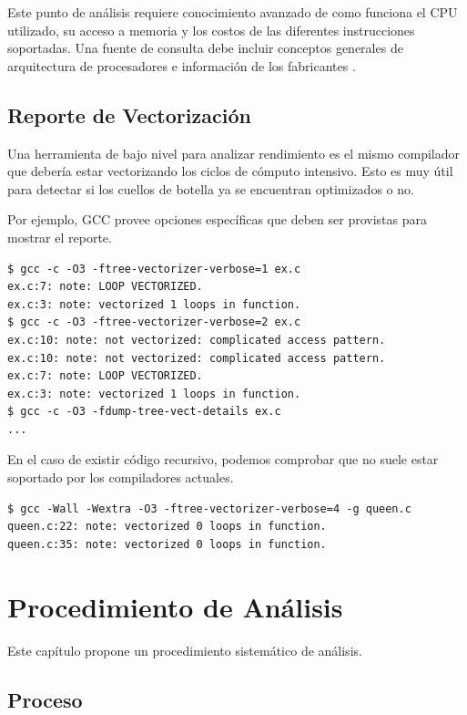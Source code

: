 \documentclass[a4paper]{report}
\begin{document}
Este punto de análisis requiere conocimiento avanzado de como funciona el CPU utilizado, su acceso a memoria y los costos de las diferentes instrucciones soportadas. Una fuente de consulta debe incluir conceptos generales de arquitectura de procesadores \cite{hennessy} e información de los fabricantes \cite{intel-optimization}.

\section{Reporte de Vectorización}

Una herramienta de bajo nivel para analizar rendimiento es el mismo compilador
que debería estar vectorizando los ciclos de cómputo intensivo. Esto es muy
útil para detectar si los cuellos de botella ya se encuentran optimizados o no.

\bigskip

Por ejemplo, GCC provee opciones específicas que deben ser provistas para mostrar el reporte.

\begin{lstlisting}
$ gcc -c -O3 -ftree-vectorizer-verbose=1 ex.c
ex.c:7: note: LOOP VECTORIZED.
ex.c:3: note: vectorized 1 loops in function.
$ gcc -c -O3 -ftree-vectorizer-verbose=2 ex.c
ex.c:10: note: not vectorized: complicated access pattern.
ex.c:10: note: not vectorized: complicated access pattern.
ex.c:7: note: LOOP VECTORIZED.
ex.c:3: note: vectorized 1 loops in function.
$ gcc -c -O3 -fdump-tree-vect-details ex.c
...
\end{lstlisting}

En el caso de existir código recursivo, podemos comprobar que no suele estar soportado por los compiladores actuales.

\begin{lstlisting}
$ gcc -Wall -Wextra -O3 -ftree-vectorizer-verbose=4 -g queen.c
queen.c:22: note: vectorized 0 loops in function.
queen.c:35: note: vectorized 0 loops in function.
\end{lstlisting}

\chapter{Procedimiento de Análisis}\label{chapter:procedure}

Este capítulo propone un procedimiento sistemático de análisis.

\section{Proceso}
\end{document}
